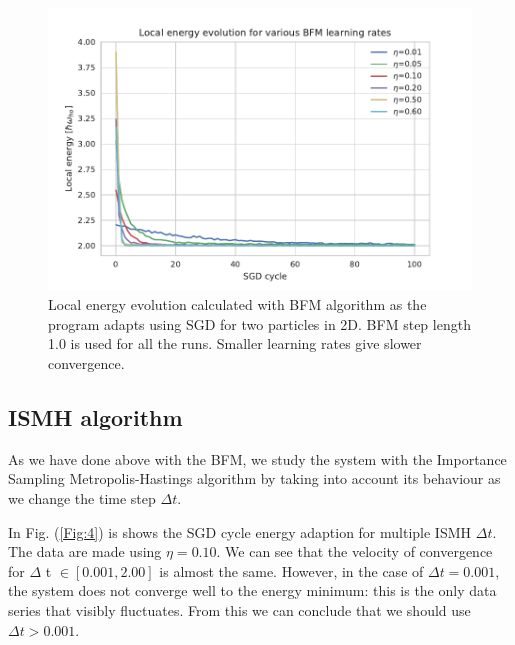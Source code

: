 \begin{figure}[H]
\centering
\includegraphics[scale=1.00]{plot3.pdf}
\caption{Local energy evolution calculated with BFM algorithm as the program adapts using SGD for two particles in 2D. BFM step length 1.0 is used for all the runs. Smaller learning rates give slower convergence.}
\label{Fig:3}
\end{figure}


\subsection{ISMH algorithm}

As we have done above with the BFM, we study the system with the Importance Sampling Metropolis-Hastings algorithm by taking into account its behaviour as we change the time step $\Delta t$. 

In Fig. (\ref{Fig:4}) is shows the SGD cycle energy adaption for multiple ISMH $\Delta t$. The data are made using $\eta = 0.10$. We can see that the velocity of convergence for $\Delta$ t $\in [0.001,2.00]$ is almost the same. However, in the case of $\Delta t=0.001$, the system does not converge well to the energy minimum: this is the only data series that visibly fluctuates. From this we can conclude that we should use $\Delta t > 0.001$. 


